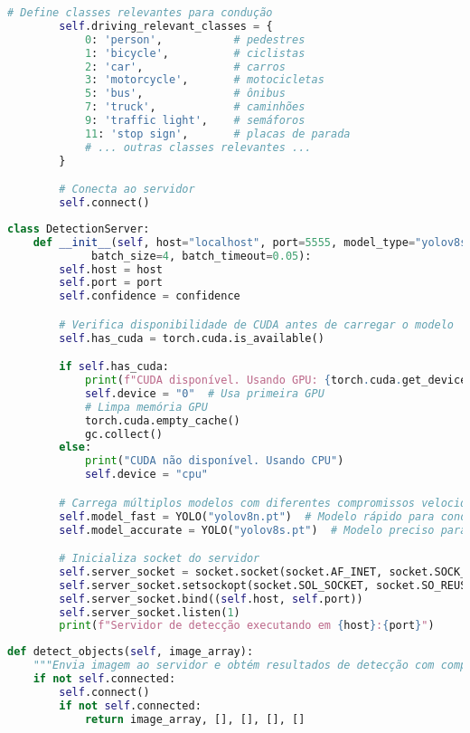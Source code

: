 \documentclass[
	12pt,				%
	oneside, %
	a4paper,			%
	english,			%
	french,				%
	spanish,			%
	brazil				%
	]{abntex2}
\begin{document}
\begin{apendicesenv}
\begin{lstlisting}[language=Python, caption=Inicialização do cliente de detecção., label=lst:detector_client_init]
        # Define classes relevantes para condução
        self.driving_relevant_classes = {
            0: 'person',           # pedestres
            1: 'bicycle',          # ciclistas
            2: 'car',              # carros
            3: 'motorcycle',       # motocicletas
            5: 'bus',              # ônibus
            7: 'truck',            # caminhões
            9: 'traffic light',    # semáforos
            11: 'stop sign',       # placas de parada
            # ... outras classes relevantes ...
        }

        # Conecta ao servidor
        self.connect()
\end{lstlisting}

\begin{lstlisting}[language=Python, caption=Inicialização do servidor de detecção YOLOv8., label=lst:detector_server_init]
class DetectionServer:
    def __init__(self, host="localhost", port=5555, model_type="yolov8s.pt", confidence=0.6,
             batch_size=4, batch_timeout=0.05):
        self.host = host
        self.port = port
        self.confidence = confidence

        # Verifica disponibilidade de CUDA antes de carregar o modelo
        self.has_cuda = torch.cuda.is_available()

        if self.has_cuda:
            print(f"CUDA disponível. Usando GPU: {torch.cuda.get_device_name(0)}")
            self.device = "0"  # Usa primeira GPU
            # Limpa memória GPU
            torch.cuda.empty_cache()
            gc.collect()
        else:
            print("CUDA não disponível. Usando CPU")
            self.device = "cpu"

        # Carrega múltiplos modelos com diferentes compromissos velocidade-precisão
        self.model_fast = YOLO("yolov8n.pt")  # Modelo rápido para condução normal
        self.model_accurate = YOLO("yolov8s.pt")  # Modelo preciso para cenários críticos

        # Inicializa socket do servidor
        self.server_socket = socket.socket(socket.AF_INET, socket.SOCK_STREAM)
        self.server_socket.setsockopt(socket.SOL_SOCKET, socket.SO_REUSEADDR, 1)
        self.server_socket.bind((self.host, self.port))
        self.server_socket.listen(1)
        print(f"Servidor de detecção executando em {host}:{port}")
\end{lstlisting}

\begin{lstlisting}[language=Python, caption=Método de detecção de objetos do cliente., label=lst:detector_client_detect]
def detect_objects(self, image_array):
    """Envia imagem ao servidor e obtém resultados de detecção com compressão"""
    if not self.connected:
        self.connect()
        if not self.connected:
            return image_array, [], [], [], []


\end{lstlisting}
\end{apendicesenv}
\end{document}
